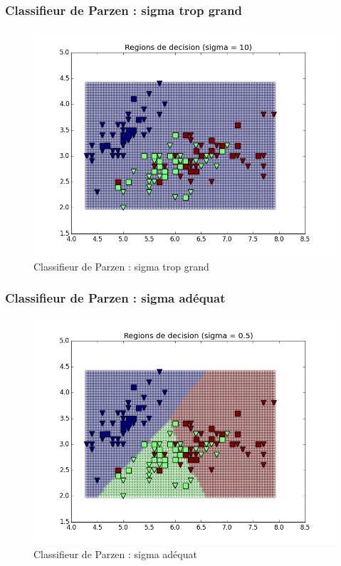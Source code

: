 \documentclass[a4paper,10pt]{article}
\begin{document}
\subsubsection{Classifieur de Parzen : sigma trop grand}
\begin{figure}[H]
	\includegraphics[width=12cm]{images/bayes_parzen_grand.png} 
	\centering
	\caption{Classifieur de Parzen : sigma trop grand}
	\label{fig:comp}
\end{figure}

\subsubsection{Classifieur de Parzen : sigma adéquat}
\begin{figure}[H]
	\includegraphics[width=12cm]{images/bayes_parzen_bon.png} 
	\centering
	\caption{Classifieur de Parzen : sigma adéquat}
	\label{fig:comp}
\end{figure}
\end{document}
